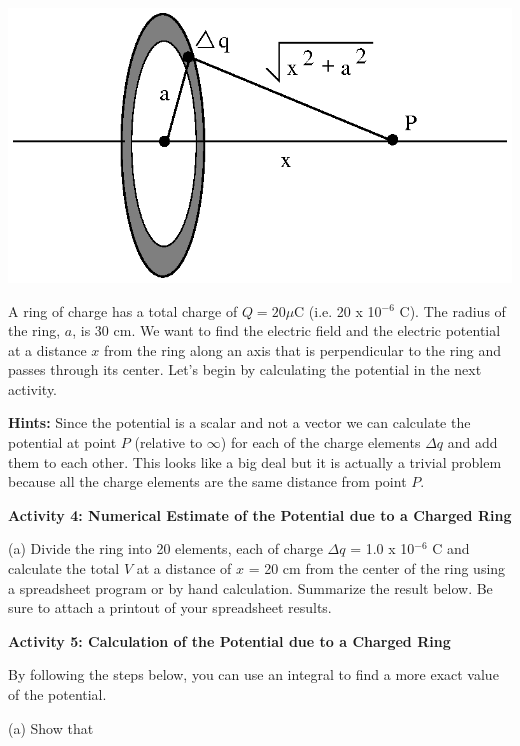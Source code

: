 \vspace{0.3cm}
{\centering \includegraphics[scale=0.8]{electric_potential/electric_potential_fig_5.eps} \par}
\vspace{0.3cm}

\vspace{2in}
A ring of charge has a total charge of $Q = 20$\( \mu  \)C (i.e. 20
x 10\( ^{-6} \) C). The radius of the ring, $a$, is 30 cm. We want
to find the electric field and the electric potential at a distance $x$ from the ring along an axis that is perpendicular to the ring
and passes through its center. Let's begin by calculating the potential
in the next activity.

\textbf{Hints:} Since the potential is a scalar and not a vector we
can calculate the potential at point $P$ (relative to \( \infty  \))
for each of the charge elements \( \Delta q \) and add them to each
other. This looks like a big deal but it is actually a trivial problem
because all the charge elements are the same distance from point $P$.

\textbf{Activity 4: Numerical Estimate of the Potential due to a Charged
Ring}

(a) Divide the ring into 20 elements, each of charge \( \Delta q \) = 1.0 x 10\( ^{-6} \) C and
calculate the total $V$ at a distance of $x$ = 20 cm from the center of
the ring using a spreadsheet program or by hand calculation. Summarize
the result below. Be sure to attach a printout of your spreadsheet
results.
\answerspace{1.25in}

\textbf{Activity 5: Calculation of the Potential due to a Charged Ring}

By following the steps below, you can use an integral to find a more
exact value of the potential.

(a) Show that

